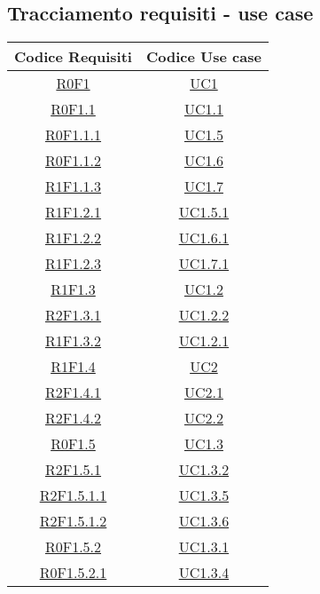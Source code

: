 \subsection{Tracciamento requisiti - use case}
\normalsize
\begin{longtable}{|c|c|}
	\hline
	\textbf{Codice Requisiti} & \textbf{Codice Use case} \\
	\hline
	\endhead
	\hyperlink{R0F1}{R0F1} & \hyperlink{UC1}{UC1}\\
	\hline
	\hyperlink{R0F1.1}{R0F1.1} & \hyperlink{UC1.1}{UC1.1}\\
	\hline
	\hyperlink{R0F1.1.1}{R0F1.1.1} & \hyperlink{UC1.5}{UC1.5}\\
	\hline
	\hyperlink{R0F1.1.2}{R0F1.1.2} & \hyperlink{UC1.6}{UC1.6}\\
	\hline
	\hyperlink{R1F1.1.3}{R1F1.1.3} & \hyperlink{UC1.7}{UC1.7}\\
	\hline
	\hyperlink{R1F1.2.1}{R1F1.2.1} & \hyperlink{UC1.5.1}{UC1.5.1}\\
	\hline
	\hyperlink{R1F1.2.2}{R1F1.2.2} & \hyperlink{UC1.6.1}{UC1.6.1}\\
	\hline
	\hyperlink{R1F1.2.3}{R1F1.2.3} & \hyperlink{UC1.7.1}{UC1.7.1}\\
	\hline
	\hyperlink{R1F1.3}{R1F1.3} & \hyperlink{UC1.2}{UC1.2}\\
	\hline
	\hyperlink{R2F1.3.1}{R2F1.3.1} & \hyperlink{UC1.2.2}{UC1.2.2}\\
	\hline
	\hyperlink{R1F1.3.2}{R1F1.3.2} & \hyperlink{UC1.2.1}{UC1.2.1}\\
	\hline
	\hyperlink{R1F1.4}{R1F1.4} & \hyperlink{UC2}{UC2}\\
	\hline
	\hyperlink{R2F1.4.1}{R2F1.4.1} & \hyperlink{UC2.1}{UC2.1}\\
	\hline
	\hyperlink{R2F1.4.2}{R2F1.4.2} & \hyperlink{UC2.2}{UC2.2}\\
	\hline
	\hyperlink{R0F1.5}{R0F1.5} & \hyperlink{UC1.3}{UC1.3}\\
	\hline
	\hyperlink{R2F1.5.1}{R2F1.5.1} & \hyperlink{UC1.3.2}{UC1.3.2}\\
	\hline
	\hyperlink{R2F1.5.1.1}{R2F1.5.1.1} & \hyperlink{UC1.3.5}{UC1.3.5}\\
	\hline
	\hyperlink{R2F1.5.1.2}{R2F1.5.1.2} & \hyperlink{UC1.3.6}{UC1.3.6}\\
	\hline
	\hyperlink{R0F1.5.2}{R0F1.5.2} & \hyperlink{UC1.3.1}{UC1.3.1}\\
	\hline
	\hyperlink{R0F1.5.2.1}{R0F1.5.2.1} & \hyperlink{UC1.3.4}{UC1.3.4}\\
	\hline

\end{longtable}
